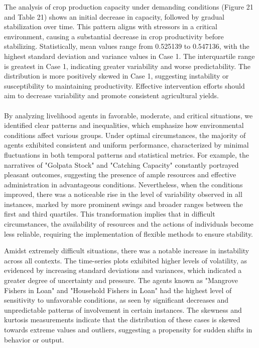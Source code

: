 \documentclass[final,5p,times,twocolumn,authoryear]{elsarticle}
\begin{document}
The analysis of crop production capacity under demanding conditions (Figure 21 and Table 21) shows an initial decrease in capacity, followed by gradual stabilization over time. This pattern aligns with stressors in a critical environment, causing a substantial decrease in crop productivity before stabilizing. Statistically, mean values range from 0.525139 to 0.547136, with the highest standard deviation and variance values in Case 1. The interquartile range is greatest in Case 1, indicating greater variability and worse predictability. The distribution is more positively skewed in Case 1, suggesting instability or susceptibility to maintaining productivity. Effective intervention efforts should aim to decrease variability and promote consistent agricultural yields.\\
\\
By analyzing livelihood agents in favorable, moderate, and critical situations, we identified clear patterns and inequalities, which emphasize how environmental conditions affect various groups. Under optimal circumstances, the majority of agents exhibited consistent and uniform performance, characterized by minimal fluctuations in both temporal patterns and statistical metrics. For example, the narratives of "Golpata Stock" and "Catching Capacity" constantly portrayed pleasant outcomes, suggesting the presence of ample resources and effective administration in advantageous conditions. Nevertheless, when the conditions improved, there was a noticeable rise in the level of variability observed in all instances, marked by more prominent swings and broader ranges between the first and third quartiles. This transformation implies that in difficult circumstances, the availability of resources and the actions of individuals become less reliable, requiring the implementation of flexible methods to ensure stability.

Amidst extremely difficult situations, there was a notable increase in instability across all contexts. The time-series plots exhibited higher levels of volatility, as evidenced by increasing standard deviations and variances, which indicated a greater degree of uncertainty and pressure. The agents known as "Mangrove Fishers in Loan" and "Household Fishers in Loan" had the highest level of sensitivity to unfavorable conditions, as seen by significant decreases and unpredictable patterns of involvement in certain instances. The skewness and kurtosis measurements indicate that the distribution of these cases is skewed towards extreme values and outliers, suggesting a propensity for sudden shifts in behavior or output.
\end{document}
